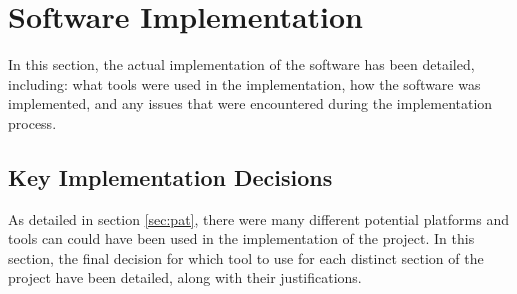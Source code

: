\section{Software Implementation}
In this section, the actual implementation of the software has been detailed, including: what tools were used in the implementation, how the software was implemented, and any issues that were encountered during the implementation process.



\subsection{Key Implementation Decisions}
\label{sec:kid}
As detailed in section \ref{sec:pat}, there were many different potential platforms and tools can could have been used in the implementation of the project. In this section, the final decision for which tool to use for each distinct section of the project have been detailed, along with their justifications.


